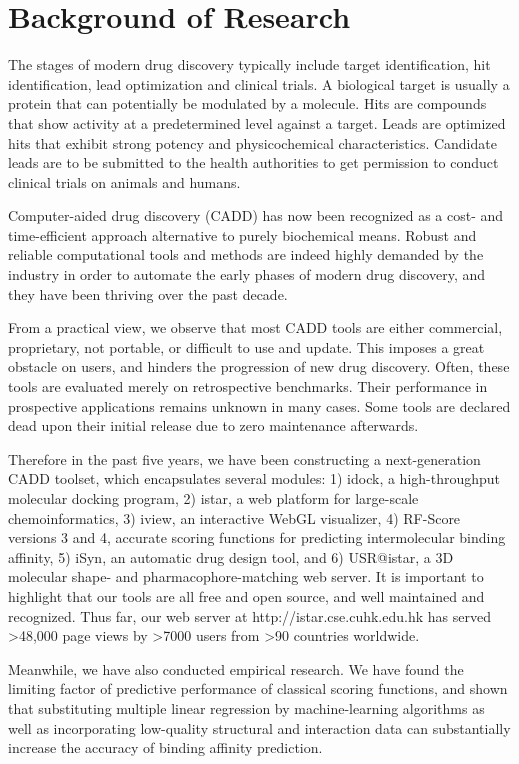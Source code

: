 \documentclass[a4paper,12pt]{article}
\begin{document}
\section*{Background of Research}

The stages of modern drug discovery typically include target identification, hit identification, lead optimization and clinical trials. A biological target is usually a protein that can potentially be modulated by a molecule. Hits are compounds that show activity at a predetermined level against a target. Leads are optimized hits that exhibit strong potency and physicochemical characteristics. Candidate leads are to be submitted to the health authorities to get permission to conduct clinical trials on animals and humans.

Computer-aided drug discovery (CADD) has now been recognized as a cost- and time-efficient approach alternative to purely biochemical means. Robust and reliable computational tools and methods are indeed highly demanded by the industry in order to automate the early phases of modern drug discovery, and they have been thriving over the past decade.

From a practical view, we observe that most CADD tools are either commercial, proprietary, not portable, or difficult to use and update. This imposes a great obstacle on users, and hinders the progression of new drug discovery. Often, these tools are evaluated merely on retrospective benchmarks. Their performance in prospective applications remains unknown in many cases. Some tools are declared dead upon their initial release due to zero maintenance afterwards.

Therefore in the past five years, we have been constructing a next-generation CADD toolset, which encapsulates several modules: 1) idock, a high-throughput molecular docking program, 2) istar, a web platform for large-scale chemoinformatics, 3) iview, an interactive WebGL visualizer, 4) RF-Score versions 3 and 4, accurate scoring functions for predicting intermolecular binding affinity, 5) iSyn, an automatic drug design tool, and 6) USR@istar, a 3D molecular shape- and pharmacophore-matching web server. It is important to highlight that our tools are all free and open source, and well maintained and recognized. Thus far, our web server at http://istar.cse.cuhk.edu.hk has served \textgreater48,000 page views by \textgreater7000 users from \textgreater90 countries worldwide.

Meanwhile, we have also conducted empirical research. We have found the limiting factor of predictive performance of classical scoring functions, and shown that substituting multiple linear regression by machine-learning algorithms as well as incorporating low-quality structural and interaction data can substantially increase the accuracy of binding affinity prediction.
\end{document}
